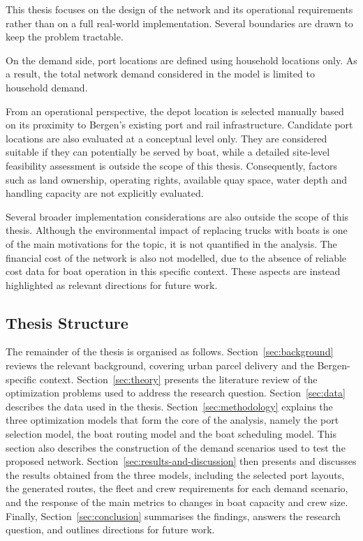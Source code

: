 \documentclass[12pt]{article}
\begin{document}
This thesis focuses on the design of the network and its operational requirements rather than on a full real-world implementation. Several boundaries are drawn to keep the problem tractable.

On the demand side, port locations are defined using household locations only. As a result, the total network demand considered in the model is limited to household demand.

From an operational perspective, the depot location is selected manually based on its proximity to Bergen's existing port and rail infrastructure. Candidate port locations are also evaluated at a conceptual level only. They are considered suitable if they can potentially be served by boat, while a detailed site-level feasibility assessment is outside the scope of this thesis. Consequently, factors such as land ownership, operating rights, available quay space, water depth and handling capacity are not explicitly evaluated.

Several broader implementation considerations are also outside the scope of this thesis. Although the environmental impact of replacing trucks with boats is one of the main motivations for the topic, it is not quantified in the analysis. The financial cost of the network is also not modelled, due to the absence of reliable cost data for boat operation in this specific context. These aspects are instead highlighted as relevant directions for future work.

\subsection{Thesis Structure}
\label{subsec:thesis-structure}

The remainder of the thesis is organised as follows. Section~\ref{sec:background} reviews the relevant background, covering urban parcel delivery and the Bergen-specific context. Section~\ref{sec:theory} presents the literature review of the optimization problems used to address the research question. Section~\ref{sec:data} describes the data used in the thesis. Section~\ref{sec:methodology} explains the three optimization models that form the core of the analysis, namely the port selection model, the boat routing model and the boat scheduling model. This section also describes the construction of the demand scenarios used to test the proposed network. Section~\ref{sec:results-and-discussion} then presents and discusses the results obtained from the three models, including the selected port layouts, the generated routes, the fleet and crew requirements for each demand scenario, and the response of the main metrics to changes in boat capacity and crew size. Finally, Section~\ref{sec:conclusion} summarises the findings, answers the research question, and outlines directions for future work.
\end{document}
